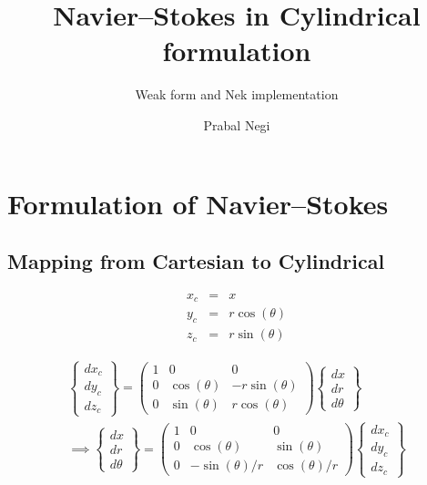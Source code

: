 \documentclass{kthreport}
\title{Navier--Stokes in Cylindrical formulation}
\subtitle{Weak form and Nek implementation}
\author{Prabal Negi}
\begin{document}
\maketitle

\section{Formulation of Navier--Stokes}

\subsection{Mapping from Cartesian to Cylindrical}

\begin{subequations}
	\begin{eqnarray}	
		x_{c}	&= & x \\
		y_{c}   &= & r\cos(\theta)\\
		z_{c}   &= &r\sin(\theta)
			\label{eqn:coord_mapping}
	\end{eqnarray}
\end{subequations}



	\begin{eqnarray}
		\begin{Bmatrix}
			dx_{c} \\
			dy_{c} \\
			dz_{c}
		\end{Bmatrix}
		 = 
		\begin{pmatrix}
		    1 &  0 &  0 \\
			0 & \cos(\theta) & -r\sin(\theta) \\
			0 & \sin(\theta) & r\cos(\theta)  
		\end{pmatrix}
		\begin{Bmatrix}
			dx \\
			dr \\
			d\theta
		\end{Bmatrix} \\
	\implies
	\begin{Bmatrix}
		dx \\
		dr \\
		d\theta
	\end{Bmatrix}
	= 
	\begin{pmatrix}
		1 &  0 &  0 \\
		0 & \cos(\theta) & \sin(\theta) \\
		0 & -\sin(\theta)/r & \cos(\theta)/r  
	\end{pmatrix}
	\begin{Bmatrix}
	dx_{c} \\
	dy_{c} \\
	dz_{c}
\end{Bmatrix}
	\end{eqnarray}
\end{document}
